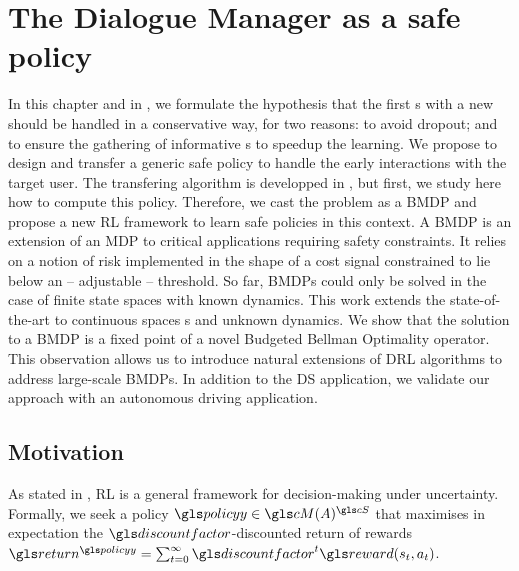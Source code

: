 \chapter{The Dialogue Manager as a safe policy }
\label{chapter:nips}

In this chapter and in , we formulate the hypothesis that the first s with a new  should be handled in a conservative way, for two reasons: to avoid  dropout; and to ensure the gathering of informative s to speedup the learning. We propose to design and transfer a  generic safe policy to handle the early interactions with the target user. The transfering algorithm is developped in , but first, we study here how to compute this policy. Therefore, we cast the  problem as a \acrfull{BMDP} and propose a new \acrfull{RL} framework to learn safe policies in this context. A \gls{BMDP} is an extension of an \acrfull{MDP} to critical applications requiring safety constraints. It relies on a notion of risk implemented in the shape of a cost signal constrained to lie below an -- adjustable -- threshold. So far, \glspl{BMDP} could only be solved in the case of finite state spaces with known dynamics. This work extends the state-of-the-art to continuous spaces s and unknown dynamics. We show that the solution to a \gls{BMDP} is a fixed point of a novel Budgeted Bellman Optimality operator. This observation allows us to introduce natural extensions of \acrfull{DRL} algorithms to address large-scale \glspl{BMDP}. In addition to the \gls{DS} application, we validate our approach with an autonomous driving application.


\section{Motivation}
\label{sec:intro}

As stated in , \gls{RL} is a general framework for decision-making under uncertainty. Formally, we seek a policy $\policy\in\cM(A)^{\cS}$ that maximises in expectation the $\discountfactor$-discounted return of rewards $\return^{\policy} = \sum_{t=0}^\infty \discountfactor^t \reward(s_t, a_t)$.

